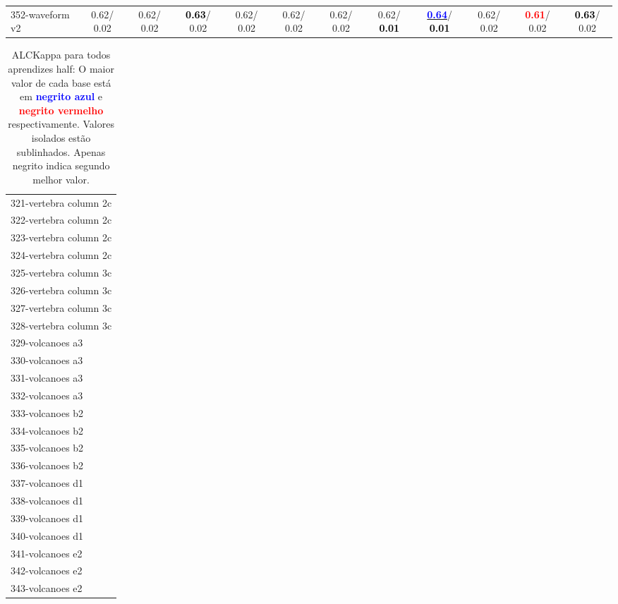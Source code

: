 \begin{table}[h]
\begin{center}
{\begin{tabular}{lc|c|c|c|c|c|c|c|c|c|c}
352-waveform v2 &   0.62/  0.02 &   0.62/  0.02 & \textcolor{black}{\textbf{  0.63}}/  0.02 &   0.62/  0.02 &   0.62/  0.02 &   0.62/  0.02 &   0.62/\textcolor{black}{\textbf{  0.01}} & \underline{\textcolor{blue}{\textbf{  0.64}}}/\textcolor{black}{\textbf{  0.01}} &   0.62/  0.02 & \textcolor{red}{\textbf{  0.61}}/  0.02 & \textcolor{black}{\textbf{  0.63}}/  0.02 \\\end{tabular}}\label{stratsALCKappa10Allalla}
\end{center}
\end{table}
\begin{table}[h]
\caption{ALCKappa para todos aprendizes half: O maior valor de cada base está em \textcolor{blue}{\textbf{negrito azul}} e \textcolor{red}{\textbf{negrito vermelho}} respectivamente. Valores isolados estão sublinhados. Apenas negrito indica segundo melhor valor.}
\begin{center}\begin{tabular}{l}
 & \\ \hline 321-vertebra column 2c &  \\
322-vertebra column 2c &  \\
323-vertebra column 2c &  \\
324-vertebra column 2c &  \\
325-vertebra column 3c &  \\
326-vertebra column 3c &  \\
327-vertebra column 3c &  \\ \hline
328-vertebra column 3c &  \\
329-volcanoes a3 &  \\
330-volcanoes a3 &  \\
331-volcanoes a3 &  \\
332-volcanoes a3 &  \\
333-volcanoes b2 &  \\
334-volcanoes b2 &  \\ \hline
335-volcanoes b2 &  \\
336-volcanoes b2 &  \\
337-volcanoes d1 &  \\
338-volcanoes d1 &  \\
339-volcanoes d1 &  \\
340-volcanoes d1 &  \\
341-volcanoes e2 &  \\ \hline
342-volcanoes e2 &  \\
343-volcanoes e2 &  \\

\end{tabular}
\end{center}
\end{table}
